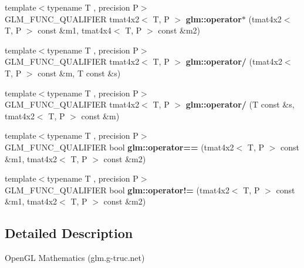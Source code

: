 \begin{DoxyCompactItemize}
\item 
\hypertarget{namespaceglm_ab6da5bbb14cd56a6a210175c7e75c8a4}{{\footnotesize template$<$typename T , precision P$>$ }\\G\-L\-M\-\_\-\-F\-U\-N\-C\-\_\-\-Q\-U\-A\-L\-I\-F\-I\-E\-R tmat4x2$<$ T, P $>$ {\bfseries glm\-::operator$\ast$} (tmat4x2$<$ T, P $>$ const \&m1, tmat4x4$<$ T, P $>$ const \&m2)}\label{namespaceglm_ab6da5bbb14cd56a6a210175c7e75c8a4}

\item 
\hypertarget{namespaceglm_affb3a385d6decce7be9c06956c1bdffc}{{\footnotesize template$<$typename T , precision P$>$ }\\G\-L\-M\-\_\-\-F\-U\-N\-C\-\_\-\-Q\-U\-A\-L\-I\-F\-I\-E\-R tmat4x2$<$ T, P $>$ {\bfseries glm\-::operator/} (tmat4x2$<$ T, P $>$ const \&m, T const \&s)}\label{namespaceglm_affb3a385d6decce7be9c06956c1bdffc}

\item 
\hypertarget{namespaceglm_a06f487068a72d3ba34ce4ebe1677b3db}{{\footnotesize template$<$typename T , precision P$>$ }\\G\-L\-M\-\_\-\-F\-U\-N\-C\-\_\-\-Q\-U\-A\-L\-I\-F\-I\-E\-R tmat4x2$<$ T, P $>$ {\bfseries glm\-::operator/} (T const \&s, tmat4x2$<$ T, P $>$ const \&m)}\label{namespaceglm_a06f487068a72d3ba34ce4ebe1677b3db}

\item 
\hypertarget{namespaceglm_ada1f939e41cfb8698776f1e46e937888}{{\footnotesize template$<$typename T , precision P$>$ }\\G\-L\-M\-\_\-\-F\-U\-N\-C\-\_\-\-Q\-U\-A\-L\-I\-F\-I\-E\-R bool {\bfseries glm\-::operator==} (tmat4x2$<$ T, P $>$ const \&m1, tmat4x2$<$ T, P $>$ const \&m2)}\label{namespaceglm_ada1f939e41cfb8698776f1e46e937888}

\item 
\hypertarget{namespaceglm_a5aa2e8081235bbd78c8d858494c582b8}{{\footnotesize template$<$typename T , precision P$>$ }\\G\-L\-M\-\_\-\-F\-U\-N\-C\-\_\-\-Q\-U\-A\-L\-I\-F\-I\-E\-R bool {\bfseries glm\-::operator!=} (tmat4x2$<$ T, P $>$ const \&m1, tmat4x2$<$ T, P $>$ const \&m2)}\label{namespaceglm_a5aa2e8081235bbd78c8d858494c582b8}

\end{DoxyCompactItemize}


\subsection{Detailed Description}
Open\-G\-L Mathematics (glm.\-g-\/truc.\-net)

